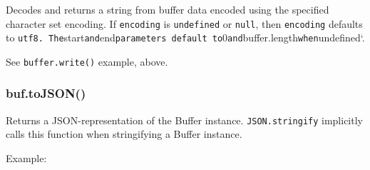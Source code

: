 Decodes and returns a string from buffer data encoded using the
specified character set encoding. If \texttt{encoding} is
\texttt{undefined} or \texttt{null}, then \texttt{encoding} defaults to
\texttt{\textquotesingle{}utf8\textquotesingle{}.\ The}start\texttt{and}end\texttt{parameters\ default\ to}0\texttt{and}buffer.length\texttt{when}undefined`.

\begin{Shaded}
\begin{Highlighting}[]
 \NormalTok{(}\NormalTok{);}
 \NormalTok{(}   
  \NormalTok{; }
\NormalTok{\}}
\NormalTok{(}\NormalTok{); }
\NormalTok{(}\NormalTok{,}\NormalTok{,}\NormalTok{); }
\NormalTok{(}\NormalTok{,}\NormalTok{,}\NormalTok{); }
\NormalTok{(}\NormalTok{,}\NormalTok{,}\NormalTok{); }
\end{Highlighting}
\end{Shaded}

See \texttt{buffer.write()} example, above.

\subsubsection{buf.toJSON()}\label{buf.tojson}

Returns a JSON-representation of the Buffer instance.
\texttt{JSON.stringify} implicitly calls this function when stringifying
a Buffer instance.

Example:

